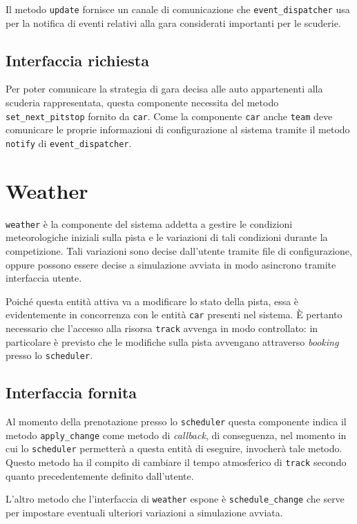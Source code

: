 \documentclass[a4paper]{report}
\newcommand{\fun}[1]{\texttt{#1}}
\begin{document}
Il metodo \fun{update} fornisce un canale di comunicazione che \texttt{event\_dispatcher} usa per la notifica di eventi relativi alla gara considerati importanti per le scuderie.

\subsection*{Interfaccia richiesta}
Per poter comunicare la strategia di gara decisa alle auto appartenenti alla scuderia rappresentata, questa componente necessita del metodo \fun{set\_next\_pitstop} fornito da \texttt{car}.
Come la componente \texttt{car} anche \texttt{team} deve comunicare le proprie informazioni di configurazione al sistema tramite il metodo \fun{notify} di \texttt{event\_dispatcher}.

\section{Weather}
\texttt{weather} è la componente del sistema addetta a gestire le condizioni meteorologiche iniziali sulla pista e le variazioni di tali condizioni durante la competizione. Tali variazioni sono decise dall'utente tramite file di configurazione, oppure possono essere decise a simulazione avviata in modo asincrono tramite interfaccia utente.

Poiché questa entità attiva va a modificare lo stato della pista, essa è evidentemente in concorrenza con le entità \texttt{car} presenti nel sistema. \`E pertanto necessario che l'accesso alla risorsa \texttt{track} avvenga in modo controllato: in particolare è previsto che le modifiche sulla pista avvengano attraverso \textit{booking} presso lo \texttt{scheduler}.

\subsection*{Interfaccia fornita}
Al momento della prenotazione presso lo \texttt{scheduler} questa componente indica il metodo \fun{apply\_change} come metodo di \textit{callback}, di conseguenza, nel momento in cui lo \texttt{scheduler} permetterà a questa entità di eseguire, invocherà tale metodo. Questo metodo ha il compito di cambiare il tempo atmosferico di \texttt{track} secondo quanto precedentemente definito dall'utente.

L'altro metodo che l'interfaccia di \texttt{weather} espone è \fun{schedule\_change} che serve per impostare eventuali ulteriori variazioni a simulazione avviata.
\end{document}
